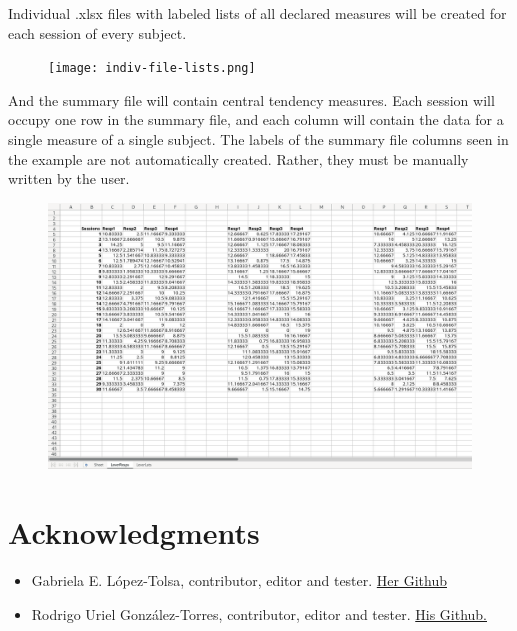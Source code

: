 \documentclass[a4paper,12pt]{article}
\begin{document}
Individual .xlsx files with labeled lists of all declared measures will be created for each session of every subject.

\begin{figure}[!ht]
    \begin{center}
        \texttt{[image: indiv-file-lists.png]}
    \end{center}
\end{figure}

And the summary file will contain central tendency measures. Each session will occupy one row in the summary file, and each column will contain the data for a single measure of a single subject. The labels of the summary file columns seen in the example are not automatically created. Rather, they must be manually written by the user.

\begin{figure}[!ht]
    \begin{center}
        \includegraphics[scale=0.35]{summary-file.png}
    \end{center}
\end{figure}

\newpage
\section{Acknowledgments}

\begin{itemize}
    \item Gabriela E. López-Tolsa, contributor, editor and tester. \href{https://github.com/GELopezTolsa}{Her Github}
\item Rodrigo Uriel González-Torres, contributor, editor and tester. \href{https://github.com/RodrigoUriGT}{His Github.}
\end{itemize}
\end{document}
